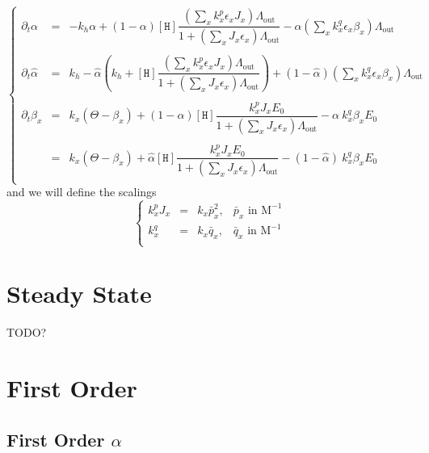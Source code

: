 \documentclass[aps,onecolumn,12pt]{revtex4}
\newcommand{\mychem}[1]{\mathtt{#1}}
\newcommand{\myconc}[1]{\left\lbrack{#1}\right\rbrack}
\newcommand{\spproton}{\mychem{H}}
\newcommand{\proton}{\myconc{\spproton}}
\newcommand{\LiAll}{\Lambda}
\newcommand{\LiAllOut}{{\LiAll}_{\mathrm{out}}}
\begin{document}
\begin{equation}
\left\lbrace
\begin{array}{rcl}
\partial_t\alpha & = &
 -k_h \alpha 
 + \left(1-\alpha\right)\proton \dfrac{\left(\sum_x k_x^p \epsilon_x J_x \right)\LiAllOut}{1+\left(\sum_x J_x \epsilon_x \right) \LiAllOut}
 - \alpha \left(\sum_x k_x^q \epsilon_x \beta_x \right) \LiAllOut\\
 \\
 \partial_t \hat\alpha & = & k_h - \hat\alpha\left(k_h+\proton\dfrac{\left(\sum_x k_x^p \epsilon_x J_x \right)\LiAllOut}{1+\left(\sum_x J_x \epsilon_x \right) \LiAllOut}\right) + (1-\hat\alpha)\left(\sum_x k_x^q \epsilon_x \beta_x \right) \LiAllOut
 \\\\
 \partial_t \beta_ x & = & k_x \left( \Theta - \beta_x \right) 
 + \left(1-\alpha\right)\proton \dfrac{k_x^p  J_x E_0 }{1+\left(\sum_x J_x \epsilon_x \right) \LiAllOut} 
 - \alpha \ k_x^q  \beta_x  E_0\\
 \\
 & = &  k_x \left( \Theta - \beta_x \right) 
 + \hat \alpha \proton \dfrac{k_x^p  J_x E_0 }{1+\left(\sum_x J_x \epsilon_x \right) \LiAllOut} 
 - \left(1-\hat\alpha\right)\ k_x^q  \beta_x  E_0\\
\end{array}
\right.
\end{equation}
and we will define the scalings
\begin{equation}
\left\lbrace
\begin{array}{ccll}
	k_x^p J_x & = & k_x \bar{p}_x^2, & \bar{p}_x \text{ in M}^{-1} \\
	k_x^q     & = & k_x \bar{q}_x  , & \bar{q}_x \text{ in M}^{-1} \\
\end{array}
\right.
\end{equation}

\section{Steady State}
TODO?

\section{First Order}
\subsection{First Order $\alpha$}
\end{document}
